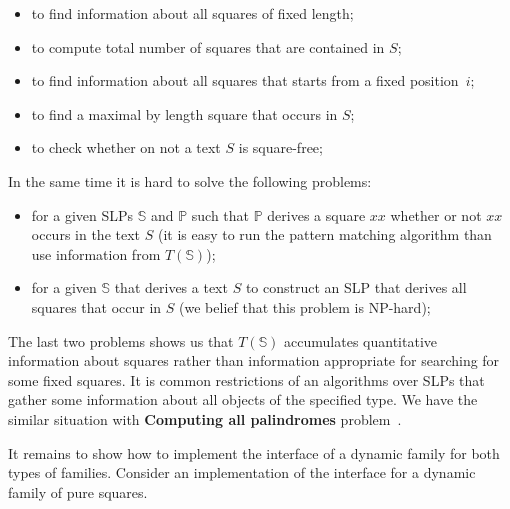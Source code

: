 \documentclass[11pt]{article}
\theoremstyle{break}
\newcommand{\slp}[1]{\mathbb{#1}}
\begin{document}
\begin{itemize}
  \item to find information about all squares of fixed length;
  \item to compute total number of squares that are contained in $S$;
  \item to find information about all squares that starts from a fixed position~$i$;
  \item to find a maximal by length square that occurs in $S$;
  \item to check whether on not a text $S$ is square-free;
\end{itemize}

In the same time it is hard to solve the following problems:

\begin{itemize}
  \item for a given SLPs $\slp{S}$ and $\slp{P}$ such that $\slp{P}$ derives a square $xx$ whether or not $xx$ occurs in
  the text $S$ (it is easy to run the pattern matching algorithm than use information from $T(\slp{S})$);
  \item for a given $\slp{S}$ that derives a text $S$ to construct an SLP that derives all squares that occur in $S$
  (we belief that this problem is NP-hard);
\end{itemize}

The last two problems shows us that $T(\slp{S})$ accumulates quantitative information about squares rather than information
appropriate for searching for some fixed squares. It is common restrictions of an algorithms over SLPs that gather some
information about all objects of the specified type. We have the similar situation with \textbf{Computing all
palindromes} problem~\cite{16}.

It remains to show how to implement the interface of a dynamic family for both types of families. Consider an implementation of
the interface for a dynamic family of pure squares.
\end{document}

